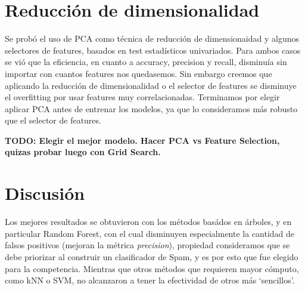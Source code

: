 \documentclass[10pt,a4paper]{article}
\begin{document}




\pagebreak

\section{Reducción de dimensionalidad}

Se probó el uso de PCA como técnica de reducción de dimensionaidad y algunos selectores de features, basados en test estadísticos univariados. Para ambos casos se vió que la eficiencia, en cuanto a accuracy, precision y recall, disminuía sin importar con cuantos features nos quedasemos. Sin embargo creemos que aplicando la reducción de dimensionalidad o el selector de features se disminuye el overfitting por usar features muy correlacionadas. Terminamos por elegir aplicar PCA antes de entrenar los modelos, ya que lo consideramos más robusto que el selector de features.

\textbf{TODO: Elegir el mejor modelo. Hacer PCA vs Feature Selection, quizas probar luego con Grid Search.}


\section{Discusión}

Los mejores resultados se obtuvieron con los métodos basádos en árboles, y en particular Random Forest, con el cual disminuyen especialmente la cantidad de falsos positivos (mejoran la métrica \textit{precision}), propiedad consideramos que se debe priorizar al construir un clasificador de Spam, y es por esto que fue elegido para la competencia. Mientras que otros métodos que requieren mayor cómputo, como kNN o SVM, no alcanzaron a tener la efectividad de otros más `sencillos'.
\end{document}

